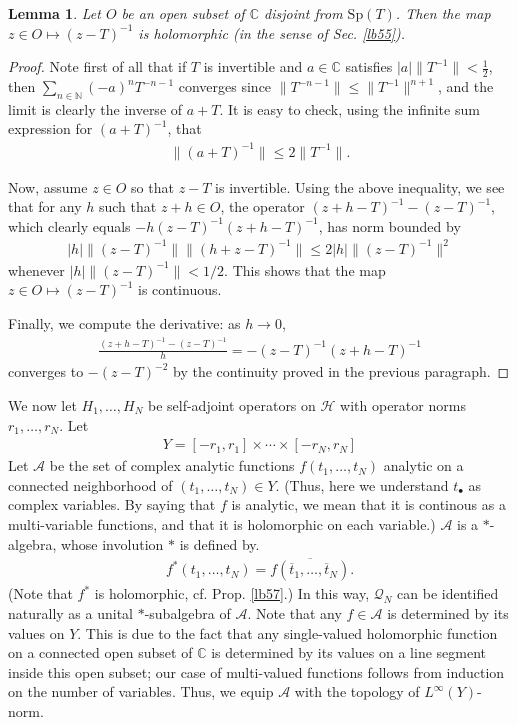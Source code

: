 \documentclass[12pt,a4paper,notitlepage]{article}
\theoremstyle{definition}
\theoremstyle{plain}
\newtheorem{lm}[df]{Lemma}
\newcommand{\mc}{\mathcal}
\newcommand{\ovl}{\overline}
\newcommand{\blt}{\bullet}
\newcommand{\Cbb}{\mathbb C}
\newcommand{\Nbb}{\mathbb N}
\newcommand{\Sp}{\mathrm{Sp}}
\numberwithin{equation}{section}
\begin{document}
\begin{lm}\label{lb4}
Let $O$ be an open subset of $\Cbb$ disjoint from $\Sp(T)$. Then the map $z\in O\mapsto (z-T)^{-1}$ is holomorphic (in the sense of Sec. \ref{lb55}).
\end{lm}



\begin{proof}
Note first of all that if $T$ is invertible and $a\in\Cbb$ satisfies $|a|\lVert T^{-1}\lVert<\frac 12 $, then $\sum_{n\in\Nbb}(-a)^nT^{-n-1}$ converges since $\lVert T^{-n-1}\lVert\leq \lVert T^{-1}\lVert^{n+1}$, and the limit is clearly the inverse of $a+T$. It is easy to check, using the infinite sum expression for $(a+T)^{-1}$, that
\begin{align*}
\lVert(a+T)^{-1}\lVert\leq 2\lVert T^{-1}\lVert.	
\end{align*}
	
Now,   assume $z\in O$ so that $z-T$ is invertible. Using the above inequality, we see that for any $h$ such that $z+h\in O$, the operator $(z+h-T)^{-1}-(z-T)^{-1}$, which clearly equals $-h(z-T)^{-1}(z+h-T)^{-1}$, has norm bounded by
\begin{align*}
|h|\lVert (z-T)^{-1}\lVert	\lVert (h+z-T)^{-1}\lVert\leq 2|h|\lVert (z-T)^{-1}\lVert^2
\end{align*}
whenever $|h|\lVert (z-T)^{-1}\lVert<1/2$. This shows that the map $z\in O\mapsto (z-T)^{-1}$ is continuous.
	
Finally, we compute the derivative: as $h\rightarrow 0$,
\begin{align*}
\frac{(z+h-T)^{-1}-(z-T)^{-1}}{h}	=-(z-T)^{-1}(z+h-T)^{-1}
\end{align*}
converges to $-(z-T)^{-2}$ by the continuity proved in the previous paragraph.
\end{proof}




We now let $H_1,\dots,H_N$ be self-adjoint operators on $\mc H$ with operator norms $r_1,\dots,r_N$. Let
\begin{align*}
Y=[-r_1,r_1]\times\cdots\times[-r_N,r_N]	
\end{align*}
Let $\mc A$ be the set of complex analytic functions $f(t_1,\dots,t_N)$ analytic on a connected neighborhood of $(t_1,\dots,t_N)\in Y$. (Thus, here we understand $t_\blt$ as complex variables. By saying that $f$ is analytic, we mean that it is continous as a multi-variable functions, and that it is holomorphic on each variable.) $\mc A$ is a $*$-algebra, whose involution $*$ is defined by.
\begin{align*}
 f^*(t_1,\dots,t_N)=\ovl{ f(\ovl t_1,\dots,\ovl t_N)}.	
\end{align*}
(Note that $f^*$ is holomorphic, cf. Prop. \ref{lb57}.) In this way, $\mc Q_N$ can be identified naturally  as a unital $*$-subalgebra of $\mc A$. Note that any $f\in\mc A$ is determined by its values on $Y$. This is due to the fact that any single-valued holomorphic function on a connected open subset of $\Cbb$ is determined by its values on a line segment inside this open subset; our case of multi-valued functions follows from induction on the number of variables. Thus, we equip $\mc A$ with the topology of $L^\infty(Y)$-norm.
\end{document}
